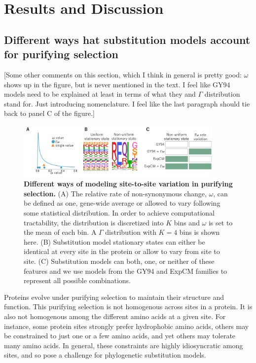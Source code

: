 \documentclass[11pt]{article}
\newcommand\jdbcomment[1]{{\color{red}[#1]}}
\begin{document}
\section*{Results and Discussion}

\subsection*{Different ways hat substitution models account for purifying selection}

\jdbcomment{Some other comments on this section, which I think in general is pretty good: $\omega$ shows up in the figure, but is never mentioned in the text. I feel like GY94 models need to be explained at least in terms of what they and $\Gamma$ distribution stand for. Just introducing nomenclature. I feel like the last paragraph should tie back to panel C of the figure.}

\begin{figure}[H]
\centerline{\includegraphics[width=0.90\textwidth]{figures/model_feature.pdf}}
\caption{\label{fig:model_feature}
\textbf{Different ways of modeling site-to-site variation in purifying selection.}
(A) The relative rate of non-synonymous change, $\omega$, can be defined as one, gene-wide average or allowed to vary following some statistical distribution.
In order to achieve computational tractability, the distribution is discretized into $K$ bins and $\omega$ is set to the mean of each bin. 
A $\Gamma$ distribution with $K=4$ bins is shown here. 
(B) Substitution model stationary states can either be identical at every site in the protein or allow to vary from site to site. 
(C) Substitution models can both, one, or neither of these features and we use models from the GY94 and ExpCM families to represent all possible combinations. 
}
\end{figure}

Proteins evolve under purifying selection to maintain their structure and function. 
This purifying selection is not homogenous across sites in a protein.
It is also not homogenous among the different amino acids at a given site.
For instance, some protein sites strongly prefer hydrophobic amino acids, others may be constrained to just one or a few amino acids, and yet others may tolerate many amino acids.
In general, these constraints are highly idiosyncratic among sites, and so pose a challenge for phylogenetic substitution models.
\end{document}
